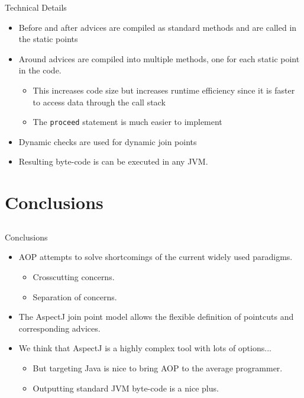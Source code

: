 \documentclass[11pt]{beamer}
\begin{document}
\begin{frame}{Technical Details}
\begin{itemize}
   \item Before and after advices are compiled as standard methods and are called in the static points
   \item Around advices are compiled into multiple methods, one for each static point in the code.
   \begin{itemize}
      \item This increases code size but increases runtime efficiency since it is faster to access data through the call stack
      \item The \texttt{proceed} statement is much easier to implement
   \end{itemize}
   \item Dynamic checks are used for dynamic join points
   \item Resulting byte-code is can be executed in any JVM.
\end{itemize}
\end{frame}


\section{Conclusions}
\subsection*{}
\begin{frame}{Conclusions}
\begin{itemize}
   \item AOP attempts to solve shortcomings of the current widely used paradigms.
   \begin{itemize}
      \item Crosscutting concerns.
      \item Separation of concerns.
   \end{itemize}
   \item The AspectJ join point model allows the flexible definition of pointcuts and corresponding advices. 
   \item We think that AspectJ is a highly complex tool with lots of options...
   \begin{itemize}
      \item But targeting Java is nice to bring AOP to the average programmer.
      \item Outputting standard JVM byte-code is a nice plus.
   \end{itemize}
\end{itemize}
\end{frame}

\section*{}
\frame{\titlepage}

\end{document}
